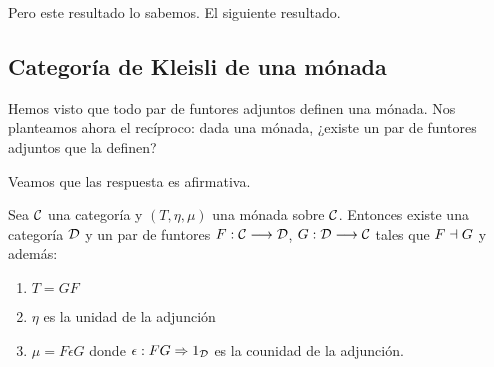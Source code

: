 Pero este resultado lo sabemos. El siguiente resultado.

\subsection{Categoría de Kleisli de una mónada}
Hemos visto que todo par de funtores adjuntos definen una mónada.
Nos planteamos ahora el recíproco: dada una mónada, ¿existe un par
de funtores adjuntos que la definen?

Veamos que las respuesta es afirmativa.

\begin{theorem}
  Sea $\mathcal{C}$ una categoría y $(T, \eta, \mu)$ una mónada
  sobre $\mathcal{C}$. Entonces existe una categoría $\mathcal{D}$ y un par
  de funtores $F : \mathcal{C}\longrightarrow \mathcal{D}$, $G : \mathcal{D}\longrightarrow \mathcal{C}$ tales
  que $F \dashv G$ y además:
  \begin{enumerate}
  \item $T = GF$
  \item $\eta$ es la unidad de la adjunción
  \item $\mu = F\epsilon G$ donde $\epsilon: FG\Rightarrow 1_{\mathcal{D}}$ es
    la counidad de la adjunción.
  \end{enumerate}
\end{theorem}
